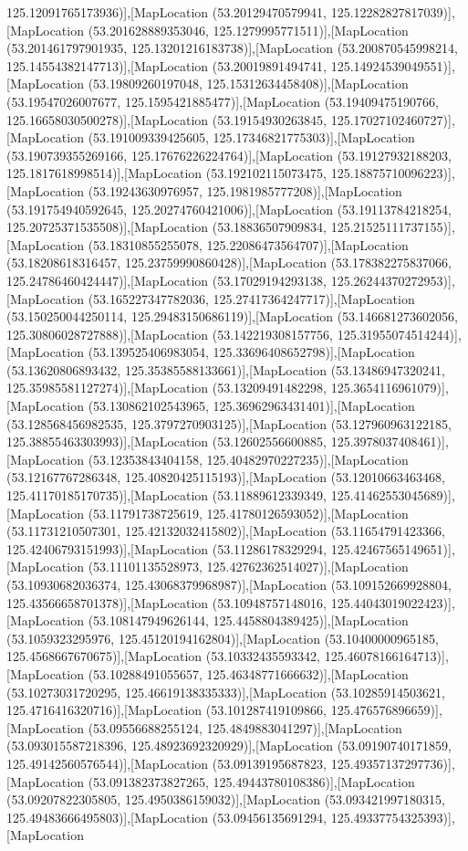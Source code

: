 125.12091765173936)],[MapLocation (53.20129470579941, 125.12282827817039)],[MapLocation (53.201628889353046, 125.1279995771511)],[MapLocation (53.201461797901935, 125.13201216183738)],[MapLocation (53.200870545998214, 125.14554382147713)],[MapLocation (53.20019891494741, 125.14924539049551)],[MapLocation (53.19809260197048, 125.15312634458408)],[MapLocation (53.19547026007677, 125.1595421885477)],[MapLocation (53.19409475190766, 125.16658030500278)],[MapLocation (53.19154930263845, 125.17027102460727)],[MapLocation (53.191009339425605, 125.17346821775303)],[MapLocation (53.190739355269166, 125.17676226224764)],[MapLocation (53.19127932188203, 125.1817618998514)],[MapLocation (53.192102115073475, 125.18875710096223)],[MapLocation (53.19243630976957, 125.1981985777208)],[MapLocation (53.191754940592645, 125.20274760421006)],[MapLocation (53.19113784218254, 125.20725371535508)],[MapLocation (53.18836507909834, 125.21525111737155)],[MapLocation (53.18310855255078, 125.22086473564707)],[MapLocation (53.18208618316457, 125.23759990860428)],[MapLocation (53.178382275837066, 125.24786460424447)],[MapLocation (53.17029194293138, 125.26244370272953)],[MapLocation (53.165227347782036, 125.27417364247717)],[MapLocation (53.150250044250114, 125.29483150686119)],[MapLocation (53.146681273602056, 125.30806028727888)],[MapLocation (53.142219308157756, 125.31955074514244)],[MapLocation (53.139525406983054, 125.33696408652798)],[MapLocation (53.13620806893432, 125.35385588133661)],[MapLocation (53.13486947320241, 125.35985581127274)],[MapLocation (53.13209491482298, 125.3654116961079)],[MapLocation (53.130862102543965, 125.36962963431401)],[MapLocation (53.128568456982535, 125.3797270903125)],[MapLocation (53.127960963122185, 125.38855463303993)],[MapLocation (53.12602556600885, 125.3978037408461)],[MapLocation (53.12353843404158, 125.40482970227235)],[MapLocation (53.12167767286348, 125.40820425115193)],[MapLocation (53.12010663463468, 125.41170185170735)],[MapLocation (53.11889612339349, 125.41462553045689)],[MapLocation (53.11791738725619, 125.41780126593052)],[MapLocation (53.11731210507301, 125.42132032415802)],[MapLocation (53.11654791423366, 125.42406793151993)],[MapLocation (53.11286178329294, 125.42467565149651)],[MapLocation (53.11101135528973, 125.42762362514027)],[MapLocation (53.10930682036374, 125.43068379968987)],[MapLocation (53.109152669928804, 125.43566658701378)],[MapLocation (53.10948757148016, 125.44043019022423)],[MapLocation (53.108147949626144, 125.4458804389425)],[MapLocation (53.1059323295976, 125.45120194162804)],[MapLocation (53.10400000965185, 125.4568667670675)],[MapLocation (53.10332435593342, 125.46078166164713)],[MapLocation (53.10288491055657, 125.46348771666632)],[MapLocation (53.10273031720295, 125.46619138335333)],[MapLocation (53.10285914503621, 125.4716416320716)],[MapLocation (53.101287419109866, 125.476576896659)],[MapLocation (53.09556688255124, 125.4849883041297)],[MapLocation (53.093015587218396, 125.48923692320929)],[MapLocation (53.09190740171859, 125.49142560576544)],[MapLocation (53.09139195687823, 125.49357137297736)],[MapLocation (53.091382373827265, 125.49443780108386)],[MapLocation (53.09207822305805, 125.4950386159032)],[MapLocation (53.093421997180315, 125.49483666495803)],[MapLocation (53.09456135691294, 125.49337754325393)],[MapLocation 